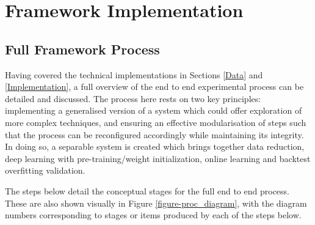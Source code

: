 \documentclass[a4paper,11pt,oneside]{article}
\theoremstyle{plain}
\theoremstyle{definition}
\begin{document}
		
		
	\newpage	
	\section{Framework Implementation}\label{imp_proc}
	
	\subsection{Full Framework Process}\label{imp_fullproc}
	
	Having covered the technical implementations in Sections \ref{Data} and \ref{Implementation}, a full overview of the end to end experimental process can be detailed and discussed. The process here rests on two key principles: implementing a generalised version of a system which could offer exploration of more complex techniques, and ensuring an effective modularisation of steps such that the process can be reconfigured accordingly while maintaining its integrity. In doing so, a separable system is created which brings together data reduction, deep learning with pre-training/weight initialization, online learning and backtest overfitting validation.\newline 

	The steps below detail the conceptual stages for the full end to end process. These are also shown visually in Figure \ref{figure-proc_diagram}, with the diagram numbers corresponding to stages or items produced by each of the steps below.
	
\end{document}
